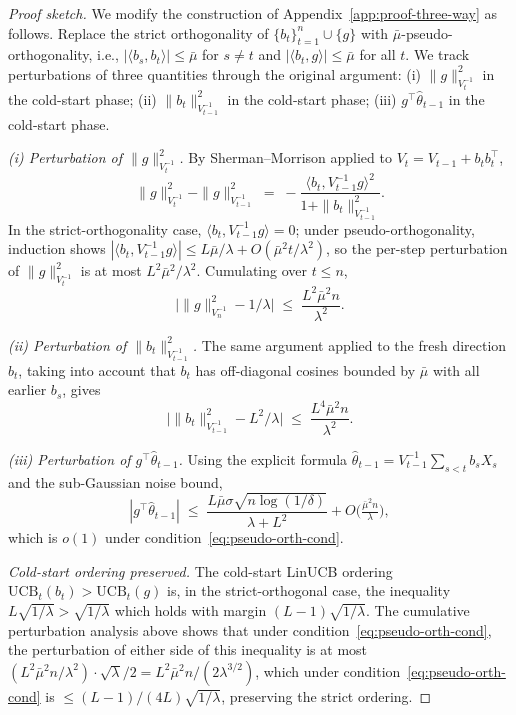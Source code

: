 \documentclass{article}
\theoremstyle{definition}
\theoremstyle{remark}
\theoremstyle{remark}
\begin{document}
\begin{proof}[Proof sketch]
We modify the construction of Appendix~\ref{app:proof-three-way} as
follows. Replace the strict orthogonality of
$\{b_t\}_{t=1}^n\cup\{g\}$ with $\bar\mu$-pseudo-orthogonality, i.e.,
$|\langle b_s,b_t\rangle|\le\bar\mu$ for $s\ne t$ and
$|\langle b_t,g\rangle|\le\bar\mu$ for all $t$. We track perturbations
of three quantities through the original argument:
(i) $\|g\|_{V_t^{-1}}^2$ in the cold-start phase;
(ii) $\|b_t\|_{V_{t-1}^{-1}}^2$ in the cold-start phase;
(iii) $g^\top \widehat\theta_{t-1}$ in the cold-start phase.

\emph{(i) Perturbation of $\|g\|_{V_t^{-1}}^2$.}
By Sherman--Morrison applied to $V_t=V_{t-1}+b_tb_t^\top$,
\[
\|g\|_{V_t^{-1}}^2 - \|g\|_{V_{t-1}^{-1}}^2
\;=\;
-\frac{\langle b_t, V_{t-1}^{-1}g\rangle^2}{1+\|b_t\|_{V_{t-1}^{-1}}^2}.
\]
In the strict-orthogonality case, $\langle b_t,V_{t-1}^{-1}g\rangle=0$;
under pseudo-orthogonality, induction shows
$|\langle b_t,V_{t-1}^{-1}g\rangle|\le L\bar\mu/\lambda+O(\bar\mu^2 t/\lambda^2)$,
so the per-step perturbation of $\|g\|_{V_t^{-1}}^2$ is at most
$L^2\bar\mu^2/\lambda^2$. Cumulating over $t\le n$,
\[
\bigl|\|g\|_{V_n^{-1}}^2 - 1/\lambda\bigr|
\;\le\;
\frac{L^2\bar\mu^2 n}{\lambda^2}.
\]

\emph{(ii) Perturbation of $\|b_t\|_{V_{t-1}^{-1}}^2$.}
The same argument applied to the fresh direction $b_t$, taking into
account that $b_t$ has off-diagonal cosines bounded by $\bar\mu$ with
all earlier $b_s$, gives
\[
\bigl|\|b_t\|_{V_{t-1}^{-1}}^2-L^2/\lambda\bigr|
\;\le\;
\frac{L^4\bar\mu^2 n}{\lambda^2}.
\]

\emph{(iii) Perturbation of $g^\top\widehat\theta_{t-1}$.}
Using the explicit formula
$\widehat\theta_{t-1}=V_{t-1}^{-1}\sum_{s<t}b_sX_s$ and the
sub-Gaussian noise bound,
\[
|g^\top\widehat\theta_{t-1}|
\;\le\;
\frac{L\bar\mu\sigma\sqrt{n\log(1/\delta)}}{\lambda+L^2}+O\bigl(\tfrac{\bar\mu^2 n}{\lambda}\bigr),
\]
which is $o(1)$ under condition~\eqref{eq:pseudo-orth-cond}.

\emph{Cold-start ordering preserved.}
The cold-start LinUCB ordering
$\mathrm{UCB}_t(b_t)>\mathrm{UCB}_t(g)$ is, in the strict-orthogonal
case, the inequality
$L\sqrt{1/\lambda}>\sqrt{1/\lambda}$ which holds with margin
$(L-1)\sqrt{1/\lambda}$. The cumulative perturbation analysis above
shows that under condition~\eqref{eq:pseudo-orth-cond}, the
perturbation of either side of this inequality is at most
$(L^2\bar\mu^2 n/\lambda^2)\cdot \sqrt\lambda/2 = L^2\bar\mu^2 n/(2\lambda^{3/2})$,
which under condition~\eqref{eq:pseudo-orth-cond} is
$\le (L-1)/(4L)\sqrt{1/\lambda}$, preserving the strict ordering.


\end{proof}
\end{document}
